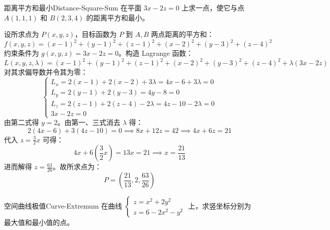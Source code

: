 \begin{problem}{距离平方和最小}{Distance-Square-Sum}
    在平面 $3x - 2z = 0$ 上求一点，使它与点 $A(1, 1, 1)$ 和 $B(2, 3, 4)$ 的距离平方和最小。
\end{problem}

\begin{solution}
    设所求点为 $P(x, y, z)$，目标函数为 $P$ 到 $A, B$ 两点距离的平方和：
    \begin{equation}
        f(x, y, z) = (x-1)^2 + (y-1)^2 + (z-1)^2 + (x-2)^2 + (y-3)^2 + (z-4)^2
    \end{equation}
    约束条件为 $g(x, y, z) = 3x - 2z = 0$。构造 Lagrange 函数：
    \begin{equation}
        L(x, y, z, \lambda) = (x-1)^2 + (y-1)^2 + (z-1)^2 + (x-2)^2 + (y-3)^2 + (z-4)^2 + \lambda(3x - 2z)
    \end{equation}
    对其求偏导数并令其为零：
    \begin{equation}
        \begin{cases}
            L_x = 2(x-1) + 2(x-2) + 3\lambda = 4x - 6 + 3\lambda = 0  \\
            L_y = 2(y-1) + 2(y-3) = 4y - 8 = 0                        \\
            L_z = 2(z-1) + 2(z-4) - 2\lambda = 4z - 10 - 2\lambda = 0 \\
            3x - 2z = 0
        \end{cases}
    \end{equation}
    由第二式得 $y = 2$。由第一、三式消去 $\lambda$ 得：
    \begin{equation}
        2(4x - 6) + 3(4z - 10) = 0 \implies 8x + 12z = 42 \implies 4x + 6z = 21
    \end{equation}
    代入 $z = \frac{3}{2}x$ 可得：
    \begin{equation}
        4x + 6\left( \frac{3}{2}x \right) = 13x = 21 \implies x = \frac{21}{13}
    \end{equation}
    进而解得 $z = \frac{63}{26}$。故所求点为：
    \begin{equation}
        \boxed{P = \left( \frac{21}{13}, 2, \frac{63}{26} \right)}
    \end{equation}
\end{solution}

\begin{problem}{空间曲线极值}{Curve-Extremum}
    在曲线 $\begin{cases} z = x^2 + 2y^2 \\ z = 6 - 2x^2 - y^2 \end{cases}$ 上，求竖坐标分别为最大值和最小值的点。
\end{problem}

